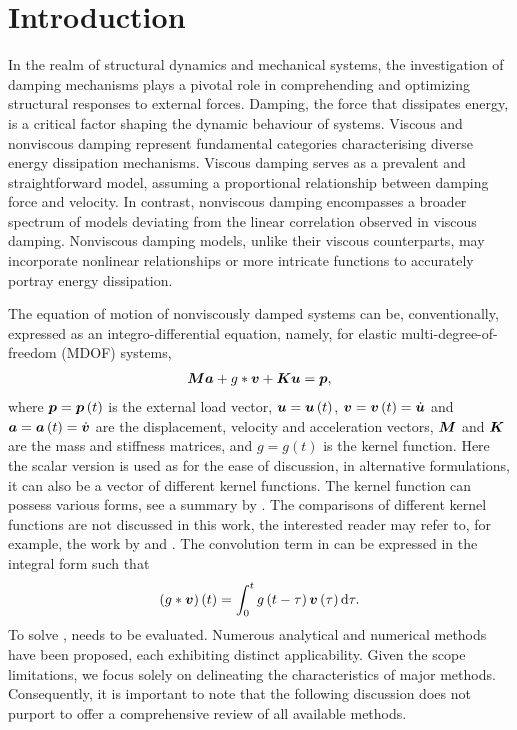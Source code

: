 \section{Introduction}
In the realm of structural dynamics and mechanical systems, the investigation of damping mechanisms plays a pivotal role in comprehending and optimizing structural responses to external forces. Damping, the force that dissipates energy, is a critical factor shaping the dynamic behaviour of systems. Viscous and nonviscous damping represent fundamental categories characterising diverse energy dissipation mechanisms. Viscous damping serves as a prevalent and straightforward model, assuming a proportional relationship between damping force and velocity. In contrast, nonviscous damping encompasses a broader spectrum of models deviating from the linear correlation observed in viscous damping. Nonviscous damping models, unlike their viscous counterparts, may incorporate nonlinear relationships or more intricate functions to accurately portray energy dissipation.

The equation of motion of nonviscously damped systems can be, conventionally, expressed as an integro-differential equation, namely, for elastic multi-degree-of-freedom (MDOF) systems,
\begin{gather}\label{eq:single_eom}
\bm{M}\bm{a}+g*\bm{v}+\bm{K}\bm{u}=\bm{p},
\end{gather}
where $\bm{p}=\bm{p}\left(t\right)$ is the external load vector, $\bm{u}=\bm{u}\left(t\right)$, $\bm{v}=\bm{v}\left(t\right)=\dot{\bm{u}}$ and $\bm{a}=\bm{a}\left(t\right)=\dot{\bm{v}}$ are the displacement, velocity and acceleration vectors, $\bm{M}$ and $\bm{K}$ are the mass and stiffness matrices, and $g=g(t)$ is the kernel function. Here the scalar version is used as for the ease of discussion, in alternative formulations, it can also be a vector of different kernel functions. The kernel function can possess various forms, see a summary by \citet[][Table 1]{Adhikari2003}. The comparisons of different kernel functions are not discussed in this work, the interested reader may refer to, for example, the work by \citet{Impraimakis2022} and \citet{Impraimakis2023}. The convolution term in  can be expressed in the integral form such that
\begin{gather}\label{eq:conv}
\left(g*\bm{v}\right)\left(t\right)=\int_0^tg\left(t-\tau\right)\bm{v}\left(\tau\right)\mathrm{d}\tau.
\end{gather}
To solve ,  needs to be evaluated. Numerous analytical and numerical methods have been proposed, each exhibiting distinct applicability. Given the scope limitations, we focus solely on delineating the characteristics of major methods. Consequently, it is important to note that the following discussion does not purport to offer a comprehensive review of all available methods.
